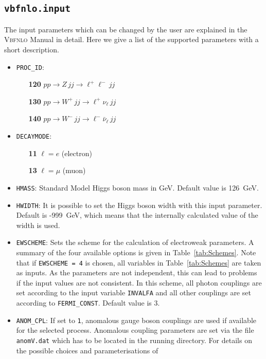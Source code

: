 \documentclass[a4paper,11pt]{article}
\begin{document}
\subsection*{{\tt vbfnlo.input}}
The input parameters which can be changed by the user are explained in the 
\textsc{Vbfnlo} Manual \cite{vbfnlo} in detail. Here we give a list of the supported parameters 
with a short description.

\begin{itemize}
\item {\tt PROC\_ID}: \begin{itemize}
        \item[\bf 120]  $p p \to Z \, jj \to \ell^{+} \ell^{-} \, jj$  
        \item[\bf 130]  $p p \to W^{+} \,  jj\to \ell^{+} \nu_\ell \, jj$  
        \item[\bf 140]  $p p \to W^{-} \, jj\to \ell^{-} \bar{\nu}_\ell  \, jj$  \end{itemize} 
\item {\tt DECAYMODE}: \begin{itemize}
        \item[\bf 11]   $\ell = e$ (electron)
        \item[\bf 13]  $\ell = \mu$ (muon)   \end{itemize}         
\item {\tt HMASS}: Standard Model Higgs boson mass in GeV. Default value is 126~GeV.
\item {\tt HWIDTH}: It is possible to set the Higgs boson width with this input
parameter.  Default is -999~GeV, which means that the internally calculated
value of the width is used. 
\item {\tt EWSCHEME}: Sets the scheme for the calculation of electroweak
parameters. A summary of the four available options is given in
Table~\ref{tab:Schemes}. Note that if {\tt EWSCHEME = 4} is
chosen, all variables in Table~\ref{tab:Schemes} are taken as inputs.  As the
parameters are not independent, this can lead to problems if the input values
are not consistent.  In this scheme, all photon couplings are set according to
the input variable {\tt INVALFA} and all other couplings are set according to
{\tt FERMI\_CONST}. Default value is 3.
\item {\tt ANOM\_CPL}: If set to {\tt 1}, anomalous gauge
boson couplings are used if available for the selected process. Anomalous
coupling parameters are set via the file {\tt anomV.dat} which has to be located 
in the running directory.
For details on the possible choices and parameterisations of 

\end{itemize}
\end{document}
